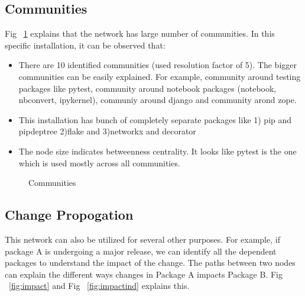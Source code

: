 \subsection{Communities} \label{comm}
Fig ~\ref{fig:community} explains that the network has large number of
communities. In this specific installation, it can be observed that:
 \begin{itemize}
\item There are 10 identified communities (used resolution factor of 5). The
bigger communities can be easily explained. For example, community around
testing packages like pytest, community around notebook packages (notebook,
nbconvert, ipykernel), communiy around django and community arond zope.
\item This installation has bunch of completely separate packages like 1) pip
and pipdeptree 2)flake and 3)networkx and decorator
\item The node size indicates betweenness centrality. It looks like pytest is
the one which is used mostly across all communities.
\end{itemize}
\begin{figure}[htbp]
\centering
{}
\caption{Communities}
\label{fig:community}
\end{figure}


\subsection{Change Propogation} \label{change}
This network can also be utilized for several other purposes. For example, if
 package A is undergoing a major release, we can identify all the dependent
 packages to understand the impact of the change. The paths between two nodes
  can explain the different ways changes in Package A impacts Package B.
  Fig ~\ref{fig:impact} and Fig ~\ref{fig:impactind}  explains this.

